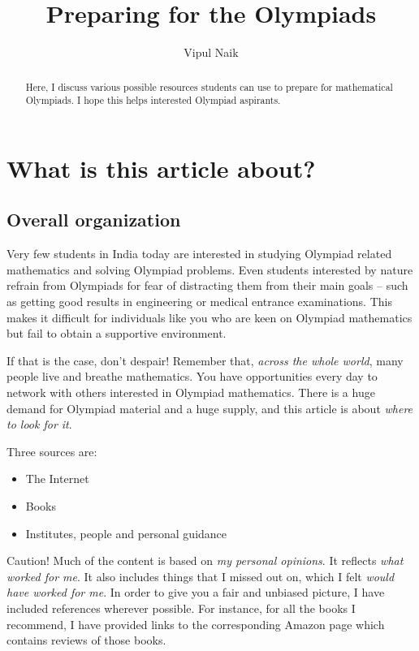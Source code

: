 \documentclass[a4paper]{amsart}
\title{Preparing for the Olympiads}
\author{Vipul Naik}
\begin{document}
\maketitle

\begin{abstract}
  Here, I discuss various possible resources students can use to prepare for
  mathematical Olympiads. I hope this helps interested Olympiad aspirants.
\end{abstract}

\section{What is this article about?}

\subsection{Overall organization}

Very few students in India today are interested in studying Olympiad related mathematics and solving Olympiad problems.
Even students interested by nature
refrain from Olympiads for fear of distracting them from their main goals -- such as getting
good results in
engineering or medical entrance examinations. 
This makes it difficult for individuals like you who are keen on Olympiad mathematics but fail to obtain a supportive environment.

If that is the case, don't despair!
Remember that, {\em across the whole world}, many people live and breathe mathematics. You have opportunities every day to network
with others interested in Olympiad mathematics. There is a huge demand for Olympiad material and a huge supply, and this article
is about {\em where to look for it}.

Three sources are:

\begin{itemize}

\item The Internet

\item Books

\item Institutes, people and personal guidance

\end{itemize}

Caution! Much of the content is based on {\em my personal opinions}. It reflects {\em what worked for me}. It also includes
things that I missed
out on, which I felt {\em would have worked for me}. 
In order to give you a fair and unbiased picture, I have included references
wherever possible. For instance, for all the books I recommend, I have provided links to the corresponding Amazon page
which contains reviews of those books.
\end{document}
